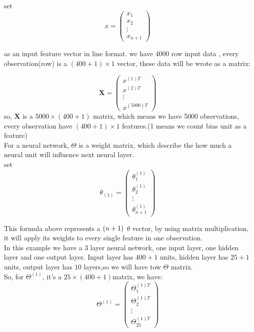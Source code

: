 \documentclass{article}
\begin{document}
set
\begin{displaymath}
x = \begin{pmatrix}x_{1} \\ x_{2} \\ \vdots \\ x_{n+1} \end{pmatrix}
\end{displaymath}

as an input feature vector in line format. we have 4000 row input data , every observation(row) is a $(400+1)\times1$ vector, these data will be wrote as a matrix:

\begin{displaymath}
\mathbf{X} = \begin{pmatrix}
x^{(1)T}\\ x^{(2)T} \\ \vdots \\ x^{(5000)T}
\end{pmatrix}
\end{displaymath}
so, $\mathbf{X}$ is a $5000 \times (400+1)$ matrix, which means we have 5000 observations, every observation have $(400+1) \times 1$ features.(1 means we count bias unit as a feature)\\

For a neural network, $\Theta$ is a weight matrix, which describe the how much a neural unit will influence next neural layer.\\
set
\begin{displaymath}
\theta_{(1)} = \begin{pmatrix}
\theta^{(1)}_{1}\\ \theta^{(1)}_{2} \\ \vdots \\ \theta^{(1)}_{n+1}
\end{pmatrix}
\end{displaymath}

This formula above represents a $(n+1) \time 1$ $\theta$ vector, by using matrix multiplication, it will apply its weights to every single feature in one observation.\\

In this example we have a 3 layer neural network, one input layer, one hidden layer and one output layer. Input layer has $400+1$ units, hidden layer has $25+1$ units, output layer has $10$ layers,so we will have tow $\Theta$ matrix.\\
So, for $\Theta^{(1)}$, it's a $25 \times (400+1)$matrix, we have:
\begin{displaymath}
\Theta^{(1)} = \begin{pmatrix}
\Theta_{1}^{(1)T} \\ \Theta_{2}^{(1)T} \\ \vdots \\ \Theta^{(1)T}_{25}
\end{pmatrix}
\end{displaymath}
\end{document}
